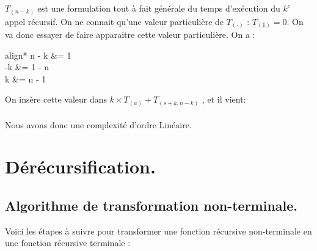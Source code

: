 \documentclass[a4paper, 11pt, oneside]{article}
\begin{document}
	
	$T_{(n - k)}$ est une formulation tout à fait générale du temps d'exécution du $k^e$ appel récursif. On ne connait 
	qu'une valeur particulière de $T_{(\cdot)}$ : $T_{(1)} = 0$. On va donc essayer de faire apparaitre cette valeur particulière.
	On a :
	
	\begin{empheq}[box=\fbox]{align*}
		n - k &= 1 \\
		-k &= 1 - n \\
		k &= n - 1
	\end{empheq}
		
	On insère cette valeur dans $k \times T_{(a)} + T_{(s + k , n - k)}$ , et il vient: \\
	
	\\
	
	Nous avons donc une complexité d’ordre Linéaire.

\section{Dérécursification.}\label{derecur}

	\subsection{Algorithme de transformation non-terminale.}
		Voici les étapes à suivre pour transformer une fonction récursive non-terminale en une fonction récursive
		terminale :
		
\end{document}
